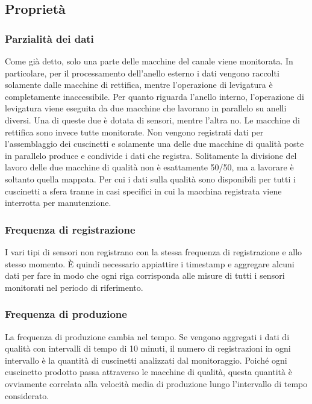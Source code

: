 \subsection{Proprietà}

\subsubsection{Parzialità dei dati}
Come già detto, solo una parte delle macchine del canale viene monitorata.
In particolare, per il processamento dell'anello esterno i dati vengono raccolti solamente dalle macchine di rettifica, mentre l'operazione di levigatura è completamente inaccessibile.
Per quanto riguarda l'anello interno, l'operazione di levigatura viene eseguita da due macchine che lavorano in parallelo su anelli diversi. Una di queste due è dotata di sensori, mentre l'altra no. Le macchine di rettifica sono invece tutte monitorate.
Non vengono registrati dati per l'assemblaggio dei cuscinetti e solamente una delle due macchine di qualità poste in parallelo produce e condivide i dati che registra. Solitamente la divisione del lavoro delle due macchine di qualità non è esattamente 50/50, ma a lavorare è soltanto quella mappata. Per cui i dati sulla qualità sono disponibili per tutti i cuscinetti a sfera tranne in casi specifici in cui la macchina registrata viene interrotta per manutenzione.

\subsubsection{Frequenza di registrazione}
I vari tipi di sensori non registrano con la stessa frequenza di registrazione e allo stesso momento.
È quindi necessario appiattire i timestamp e aggregare alcuni dati per fare in modo che ogni riga corrisponda alle misure di tutti i sensori monitorati nel periodo di riferimento.


\subsubsection{Frequenza di produzione}
La frequenza di produzione cambia nel tempo. Se vengono aggregati i dati di qualità con intervalli di tempo di 10 minuti, il numero di registrazioni in ogni intervallo è la quantità di cuscinetti analizzati dal monitoraggio.
Poiché ogni cuscinetto prodotto passa attraverso le macchine di qualità, questa quantità è ovviamente correlata alla velocità media di produzione
lungo l'intervallo di tempo considerato. 

